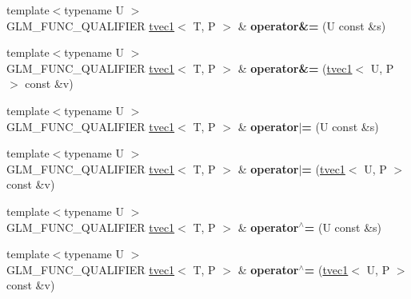 \begin{DoxyCompactItemize}
\item 
\hypertarget{structglm_1_1detail_1_1tvec1_a5b3bbcd03cec59d6a478d7692d6305f6}{{\footnotesize template$<$typename U $>$ }\\G\-L\-M\-\_\-\-F\-U\-N\-C\-\_\-\-Q\-U\-A\-L\-I\-F\-I\-E\-R \hyperlink{structglm_1_1detail_1_1tvec1}{tvec1}$<$ T, P $>$ \& {\bfseries operator\&=} (U const \&s)}\label{structglm_1_1detail_1_1tvec1_a5b3bbcd03cec59d6a478d7692d6305f6}

\item 
\hypertarget{structglm_1_1detail_1_1tvec1_a5917a9ad2db834f02c70970c5aab2fcd}{{\footnotesize template$<$typename U $>$ }\\G\-L\-M\-\_\-\-F\-U\-N\-C\-\_\-\-Q\-U\-A\-L\-I\-F\-I\-E\-R \hyperlink{structglm_1_1detail_1_1tvec1}{tvec1}$<$ T, P $>$ \& {\bfseries operator\&=} (\hyperlink{structglm_1_1detail_1_1tvec1}{tvec1}$<$ U, P $>$ const \&v)}\label{structglm_1_1detail_1_1tvec1_a5917a9ad2db834f02c70970c5aab2fcd}

\item 
\hypertarget{structglm_1_1detail_1_1tvec1_ad7e5c9133ebfccdebec443c62e91c61e}{{\footnotesize template$<$typename U $>$ }\\G\-L\-M\-\_\-\-F\-U\-N\-C\-\_\-\-Q\-U\-A\-L\-I\-F\-I\-E\-R \hyperlink{structglm_1_1detail_1_1tvec1}{tvec1}$<$ T, P $>$ \& {\bfseries operator$\vert$=} (U const \&s)}\label{structglm_1_1detail_1_1tvec1_ad7e5c9133ebfccdebec443c62e91c61e}

\item 
\hypertarget{structglm_1_1detail_1_1tvec1_ad91d6098835a4019b008360a48bde0ff}{{\footnotesize template$<$typename U $>$ }\\G\-L\-M\-\_\-\-F\-U\-N\-C\-\_\-\-Q\-U\-A\-L\-I\-F\-I\-E\-R \hyperlink{structglm_1_1detail_1_1tvec1}{tvec1}$<$ T, P $>$ \& {\bfseries operator$\vert$=} (\hyperlink{structglm_1_1detail_1_1tvec1}{tvec1}$<$ U, P $>$ const \&v)}\label{structglm_1_1detail_1_1tvec1_ad91d6098835a4019b008360a48bde0ff}

\item 
\hypertarget{structglm_1_1detail_1_1tvec1_a72ace2280c4b3e1487a469b652c120cd}{{\footnotesize template$<$typename U $>$ }\\G\-L\-M\-\_\-\-F\-U\-N\-C\-\_\-\-Q\-U\-A\-L\-I\-F\-I\-E\-R \hyperlink{structglm_1_1detail_1_1tvec1}{tvec1}$<$ T, P $>$ \& {\bfseries operator$^\wedge$=} (U const \&s)}\label{structglm_1_1detail_1_1tvec1_a72ace2280c4b3e1487a469b652c120cd}

\item 
\hypertarget{structglm_1_1detail_1_1tvec1_ab48008a42136d1116d006c44cf0a6da1}{{\footnotesize template$<$typename U $>$ }\\G\-L\-M\-\_\-\-F\-U\-N\-C\-\_\-\-Q\-U\-A\-L\-I\-F\-I\-E\-R \hyperlink{structglm_1_1detail_1_1tvec1}{tvec1}$<$ T, P $>$ \& {\bfseries operator$^\wedge$=} (\hyperlink{structglm_1_1detail_1_1tvec1}{tvec1}$<$ U, P $>$ const \&v)}\label{structglm_1_1detail_1_1tvec1_ab48008a42136d1116d006c44cf0a6da1}


\end{DoxyCompactItemize}

